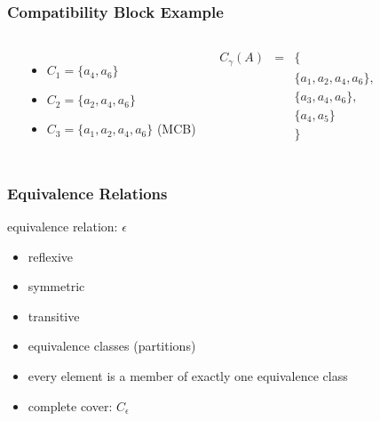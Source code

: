 \documentclass[dvipsnames]{beamer}
\begin{document}
\begin{frame}
  \frametitle{Compatibility Block Example}

  \begin{example}
    \begin{columns}
      \begin{center}
      \end{center}

      \pause
      \begin{itemize}
        \item $C_1=\{a_4,a_6\}$
        \item $C_2=\{a_2,a_4,a_6\}$
        \item $C_3=\{a_1,a_2,a_4,a_6\}$ (MCB)
      \end{itemize}

      \pause
      \medskip
      \begin{eqnarray*}
        C_\gamma (A) & = & \{\\
                      &   & \{a_1,a_2,a_4,a_6\},\\
                      &   & \{a_3,a_4,a_6\},\\
                      &   & \{a_4,a_5\}\\
                      &   & \}
      \end{eqnarray*}
    \end{columns}
  \end{example}
\end{frame}

\begin{frame}
  \frametitle{Equivalence Relations}

  \begin{definition}
    \alert{equivalence relation}: $\epsilon$
    \begin{itemize}
      \item reflexive
      \item symmetric
      \item transitive
    \end{itemize}
  \end{definition}

  \pause
  \begin{itemize}
    \item \alert{equivalence classes (partitions)}
    \item every element is a member of exactly one equivalence class

    \medskip
    \item complete cover: $C_\epsilon$
  \end{itemize}
\end{frame}
\end{document}
